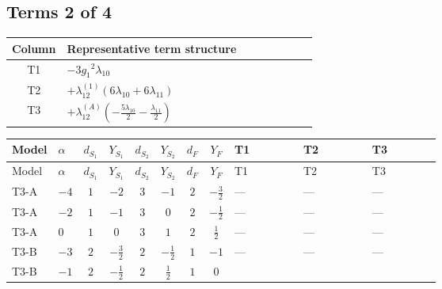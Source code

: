 \documentclass[8pt]{article}
\begin{document}
\begin{landscape}
\subsection*{Terms 2 of 4}
\begin{center}
\begin{tabular}{@{}c >{\raggedright\arraybackslash}p{0.82\linewidth}@{}}
\toprule
Column & Representative term structure \\
\midrule
T1 & \(\displaystyle -3 {g_1}^2 {\lambda_{10}}\) \\
\midrule
T2 & \(\displaystyle +{\lambda_{12}^{(1)}} (6 {\lambda_{10}}+6 {\lambda_{11}})\) \\
\midrule
T3 & \(\displaystyle +{\lambda_{12}^{(A)}} \left(-\frac{5 {\lambda_{10}}}{2}-\frac{{\lambda_{11}}}{2}\right)\) \\
\midrule
\bottomrule
\end{tabular}
\end{center}
\smallskip
\tiny
\begin{longtable}{@{}llcccccc >{\raggedright\arraybackslash}p{0.21\linewidth} >{\raggedright\arraybackslash}p{0.21\linewidth} >{\raggedright\arraybackslash}p{0.21\linewidth}@{}}
\toprule
Model & $\alpha$ & $d_{S_1}$ & $Y_{S_1}$ & $d_{S_2}$ & $Y_{S_2}$ & $d_F$ & $Y_F$ & T1 & T2 & T3 \\
\midrule
\endfirsthead
\toprule
Model & $\alpha$ & $d_{S_1}$ & $Y_{S_1}$ & $d_{S_2}$ & $Y_{S_2}$ & $d_F$ & $Y_F$ & T1 & T2 & T3 \\
\midrule
\endhead
T3-A & $-4$ & $1$ & $-2$ & $3$ & $-1$ & $2$ & $-\frac{3}{2}$ & --- & --- & --- \\
\midrule
T3-A & $-2$ & $1$ & $-1$ & $3$ & $0$ & $2$ & $-\frac{1}{2}$ & --- & --- & --- \\
\midrule
T3-A & $0$ & $1$ & $0$ & $3$ & $1$ & $2$ & $\frac{1}{2}$ & --- & --- & --- \\
\midrule
T3-B & $-3$ & $2$ & $-\frac{3}{2}$ & $2$ & $-\frac{1}{2}$ & $1$ & $-1$ & --- & --- & --- \\
\midrule
T3-B & $-1$ & $2$ & $-\frac{1}{2}$ & $2$ & $\frac{1}{2}$ & $1$ & $0$ & \scriptsize\adjustbox{max width=\linewidth}{$\begin{gathered} -3 {g_1}^2 {\lambda_{10}}\end{gathered}$} & \scriptsize\adjustbox{max width=\linewidth}{$\begin{gathered} +{\lambda_{12}^{(1)}} (6 {\lambda_{10}}+6 {\lambda_{11}})\end{gathered}$} & \scriptsize\adjustbox{max width=\linewidth}{$\begin{gathered} +{\lambda_{12}^{(A)}} \left(-\frac{5 {\lambda_{10}}}{2}-\frac{{\lambda_{11}}}{2}\right)\end{gathered}$} \\

\end{longtable}
\end{landscape}
\end{document}
